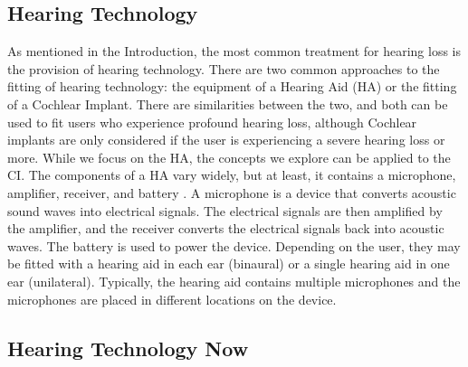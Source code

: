 \documentclass[logo,bsc,singlespacing,parskip,online]{infthesis}
\begin{document}
\subsection{Hearing Technology}
As mentioned in the Introduction, the most common treatment for hearing loss 
is the provision of hearing technology. There are two common approaches 
to the fitting of hearing technology: the equipment of a Hearing Aid (HA) 
or the fitting of a Cochlear Implant. There are similarities between the 
two, and both can be used to fit users who experience profound hearing loss, 
although Cochlear implants are only considered if the user is experiencing 
a severe hearing loss or more. While we 
focus on the HA, the concepts we explore can be applied to the CI.
The components of a HA vary widely, but at least, 
it contains a microphone, amplifier, receiver, and battery \citep{schuster-bruce_conventional_2025}.
A microphone is a device that converts acoustic sound waves into electrical signals. 
The electrical signals are then amplified by the amplifier, and the receiver converts the electrical 
signals back into acoustic waves. The battery is used to power the device. 
Depending on the user, they may be fitted with a hearing aid in each 
ear (binaural) or a single hearing aid in one ear (unilateral). 
Typically, the hearing aid contains multiple microphones and the microphones 
are placed in different locations on the device. 


\subsection{Hearing Technology Now}


\end{document}
